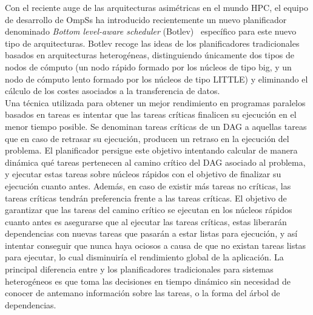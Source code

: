 
Con el reciente auge de las arquitecturas asimétricas en el mundo HPC, el
equipo de desarrollo de OmpSs ha introducido recientemente un nuevo
planificador denominado \emph{Bottom level-aware scheduler}
(Botlev)~\cite{botlev} específico para este nuevo tipo de
arquitecturas. Botlev recoge las ideas de los planificadores tradicionales
basados en arquitecturas heterogéneas, distinguiendo únicamente dos tipos
de nodos de cómputo (un nodo rápido formado por los núcleos de tipo big, y un
nodo de cómputo lento formado por los núcleos de tipo LITTLE) y eliminando el
cálculo de los costes asociados a
la transferencia de datos. \\

Una técnica utilizada para obtener un mejor rendimiento en programas
paralelos basados en tareas es intentar que las tareas críticas finalicen
su ejecución en el menor tiempo posible. Se denominan tareas críticas de un
DAG a aquellas tareas que en caso de retrasar su ejecución, producen un
retraso en la ejecución del problema. El planificador \botlev persigue este
objetivo intentando calcular de manera dinámica qué tareas pertenecen al
camino crítico del DAG asociado al problema, y ejecutar estas tareas sobre
núcleos rápidos con el objetivo de finalizar su ejecución cuanto
antes. Además, en caso de existir más tareas no críticas, las tareas
críticas tendrán preferencia frente a las tareas críticas. El objetivo de
garantizar que las tareas del camino crítico se ejecutan en los núcleos
rápidos cuanto antes es asegurarse que al ejecutar las tareas críticas,
estas liberarán dependencias con nuevas tareas que pasarán a estar listas
para ejecución, y así intentar conseguir que nunca haya \wts ociosos a
causa de que no existan tareas listas para ejecutar, lo cual disminuiría el
rendimiento global de la aplicación. La principal diferencia entre \botlev y
los planificadores tradicionales para sistemas heterogéneos es que \botlev
toma las decisiones en tiempo dinámico sin necesidad de conocer de antemano
información sobre las tareas, o la forma del árbol de dependencias.

